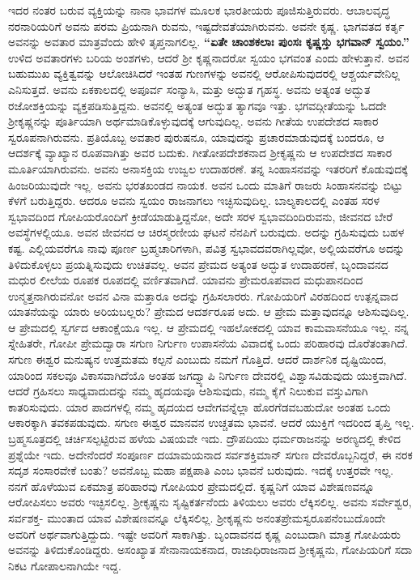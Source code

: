 ಇದರ ನಂತರ ಬರುವ ವ್ಯಕ್ತಿಯನ್ನು ನಾನಾ ಭಾವಗಳ ಮೂಲಕ ಭಾರತೀಯರು ಪೂಜಿಸುತ್ತಿರುವರು. ಆಬಾಲವೃದ್ಧ ನರನಾರಿಯರಿಗೆ ಅವನು ಪರಮ ಪ್ರಿಯನಾಗಿ ರುವನು, ಇಷ್ಟದೇವತೆಯಾಗಿರುವನು. ಅವನೇ ಕೃಷ್ಣ. ಭಾಗವತದ ಕರ್ತೃ ಅವನನ್ನು ಅವತಾರ ಮಾತ್ರವೆಂದು ಹೇಳಿ ತೃಪ್ತನಾಗಲಿಲ್ಲ. \textbf{“ಏತೇ ಚಾಂಶಕಲಾಃ ಪುಂಸಃ ಕೃಷ್ಣಸ್ತು ಭಗವಾನ್​ ಸ್ವಯಂ.”} ಉಳಿದ ಅವತಾರಗಳು ಬರಿಯ ಅಂಶಗಳು, ಆದರೆ ಶ‍್ರೀ ಕೃಷ್ಣನಾದರೋ ಸ್ವಯಂ ಭಗವಂತ ಎಂದು ಹೇಳುತ್ತಾನೆ. ಅವನ ಬಹುಮುಖ ವ್ಯಕ್ತಿತ್ವವನ್ನು ಆಲೋಚಿಸಿದರೆ ಇಂತಹ ಗುಣಗಳನ್ನು ಅವನಲ್ಲಿ ಆರೋಪಿಸುವುದರಲ್ಲಿ ಆಶ್ಚರ್ಯವೇನಿಲ್ಲ ಎನಿಸುತ್ತದೆ. ಅವನು ಏಕಕಾಲದಲ್ಲಿ ಅಪೂರ್ವ ಸಂನ್ಯಾಸಿ, ಮತ್ತು ಅದ್ಭುತ ಗೃಹಸ್ಥ. ಅವನು ಅತ್ಯಂತ ಅದ್ಭುತ ರಜೋಶಕ್ತಿಯನ್ನು ವ್ಯಕ್ತಪಡಿಸುತ್ತಿದ್ದನು. ಅವನಲ್ಲಿ ಅತ್ಯಂತ ಅದ್ಭುತ ತ್ಯಾಗವೂ ಇತ್ತು. ಭಗವದ್ಗೀತೆಯನ್ನು ಓದದೇ ಶ‍್ರೀಕೃಷ್ಣನನ್ನು ಪೂರ್ತಿಯಾಗಿ ಅರ್ಥಮಾಡಿಕೊಳ್ಳುವುದಕ್ಕೆ ಆಗುವುದಿಲ್ಲ. ಅವನು ಗೀತೆಯ ಉಪದೇಶದ ಸಾಕಾರ ಸ್ವರೂಪನಾಗಿರುವನು. ಪ್ರತಿಯೊಬ್ಬ ಅವತಾರ ಪುರುಷನೂ, ಯಾವುದನ್ನು ಪ್ರಚಾರಮಾಡುವುದಕ್ಕೆ ಬಂದರೂ, ಆ ಆದರ್ಶಕ್ಕೆ ವ್ಯಾಖ್ಯಾನ ರೂಪವಾಗಿತ್ತು ಅವರ ಬದುಕು. ಗೀತೋಪದೇಶಕನಾದ ಶ‍್ರೀಕೃಷ್ಣನು ಆ ಉಪದೇಶದ ಸಾಕಾರ ಮೂರ್ತಿಯಾಗಿರುವನು. ಅವನು ಅನಾಸಕ್ತಿಯ ಉಜ್ವಲ ಉದಾಹರಣೆ. ತನ್ನ ಸಿಂಹಾಸನವನ್ನು ಇತರರಿಗೆ ಕೊಡುವುದಕ್ಕೆ ಹಿಂಜರಿಯುವುದೇ ಇಲ್ಲ. ಅವನು ಭರತಖಂಡದ ನಾಯಕ. ಅವನ ಒಂದು ಮಾತಿಗೆ ರಾಜರು ಸಿಂಹಾಸನವನ್ನು ಬಿಟ್ಟು ಕೆಳಗೆ ಬರುತ್ತಿದ್ದರು. ಆದರೂ ಅವನು ಸ್ವಯಂ ರಾಜನಾಗಲು ಇಚ್ಛಿಸುವುದಿಲ್ಲ. ಬಾಲ್ಯಕಾಲದಲ್ಲಿ ಎಂತಹ ಸರಳ ಸ್ವಭಾವದಿಂದ ಗೋಪಿಯರೊಂದಿಗೆ ಕ್ರೀಡೆಯಾಡುತ್ತಿದ್ದನೋ, ಅದೇ ಸರಳ ಸ್ವಭಾವದಿಂದಿರುವನು, ಜೀವನದ ಬೇರೆ ಅವಸ್ಥೆಗಳಲ್ಲಿಯೂ. ಅವನ ಜೀವನದ ಆ ಚಿರಸ್ಮರಣೀಯ ಘಟನೆ ನೆನಪಿಗೆ ಬರುವುದು. ಅದನ್ನು ಗ್ರಹಿಸುವುದು ಬಹಳ ಕಷ್ಟ. ಎಲ್ಲಿಯವರೆಗೂ ನಾವು ಪೂರ್ಣ ಬ್ರಹ್ಮಚಾರಿಗಳಾಗಿ, ಪವಿತ್ರ ಸ್ವಭಾವದವರಾಗಿಲ್ಲವೋ, ಅಲ್ಲಿಯವರೆಗೂ ಅದನ್ನು ತಿಳಿದುಕೊಳ್ಳಲು ಪ್ರಯತ್ನಿಸುವುದು ಉಚಿತವಲ್ಲ. ಅವನ ಪ್ರೇಮದ ಅತ್ಯಂತ ಅದ್ಭುತ ಉದಾಹರಣೆ, ಬೃಂದಾವನದ ಮಧುರ ಲೀಲೆಯ ರೂಪಕ ರೂಪದಲ್ಲಿ ವರ್ಣಿತವಾಗಿದೆ. ಯಾವನು ಪ್ರೇಮರೂಪವಾದ ಮಧುಪಾನದಿಂದ ಉನ್ಮತ್ತನಾಗಿರುವನೋ ಅವನ ವಿನಾ ಮತ್ತಾರೂ ಅದನ್ನು ಗ್ರಹಿಸಲಾರರು. ಗೋಪಿಯರಿಗೆ ವಿರಹದಿಂದ ಉತ್ಪನ್ನವಾದ ಯಾತನೆಯನ್ನು ಯಾರು ಅರಿಯಬಲ್ಲರು? ಪ್ರೇಮದ ಆದರ್ಶರೂಪ ಅದು. ಆ ಪ್ರೇಮ ಮತ್ತಾವುದನ್ನೂ ಆಶಿಸುವುದಿಲ್ಲ. ಆ ಪ್ರೇಮದಲ್ಲಿ ಸ್ವರ್ಗದ ಆಕಾಂಕ್ಷೆಯೂ ಇಲ್ಲ. ಆ ಪ್ರೇಮದಲ್ಲಿ ಇಹಲೋಕದಲ್ಲಿ ಯಾವ ಕಾಮವಾಸನೆಯೂ ಇಲ್ಲ. ನನ್ನ ಸ್ನೇಹಿತರೇ, ಗೋಪೀ ಪ್ರೇಮದ್ವಾರಾ ಸಗುಣ ನಿರ್ಗುಣ ಉಪಾಸನೆಯ ವಿವಾದಕ್ಕೆ ಒಂದು ಪರಿಹಾರವು ದೊರೆತಂತಾಗಿದೆ. ಸಗುಣ ಈಶ್ವರ ಮನುಷ್ಯನ ಉತ್ತಮತಮ ಕಲ್ಪನೆ ಎಂಬುದು ನಮಗೆ ಗೊತ್ತಿದೆ. ಆದರೆ ದಾರ್ಶನಿಕ ದೃಷ್ಟಿಯಿಂದ, ಯಾರಿಂದ ಸಕಲವೂ ವಿಕಾಸವಾಗಿದೆಯೊ ಅಂತಹ ಜಗದ್ವ್ಯಾಪಿ ನಿರ್ಗುಣ ದೇವರಲ್ಲಿ ವಿಶ್ವಾಸವಿಡುವುದು ಯುಕ್ತವಾಗಿದೆ. ಆದರೆ ಗ್ರಹಿಸಲು ಸಾಧ್ಯವಾದುದನ್ನು ನಮ್ಮ ಹೃದಯವೂ ಆಶಿಸುವುದು, ನಮ್ಮ ಕೈಗೆ ನಿಲುಕುವ ವಸ್ತುವಿಗಾಗಿ ಕಾತರಿಸುವುದು. ಯಾರ ಪಾದಗಳಲ್ಲಿ ನಮ್ಮ ಹೃದಯದ ಆವೇಗವನ್ನೆಲ್ಲಾ ಹೊರಗೆಡವಬಹುದೋ ಅಂತಹ ಒಂದು ಆಕಾರಕ್ಕಾಗಿ ತವಕಪಡುವುದು. ಸಗುಣ ಈಶ್ವರ ಮಾನವನ ಉಚ್ಚತಮ ಭಾವನೆ. ಆದರೆ ಯುಕ್ತಿಗೆ ಇದರಿಂದ ತೃಪ್ತಿ ಇಲ್ಲ. ಬ್ರಹ್ಮಸೂತ್ರದಲ್ಲಿ ಚರ್ಚಿಸಲ್ಪಟ್ಟಿರುವ ಹಳೆಯ ವಿಷಯವೇ ಇದು. ದ್ರೌಪದಿಯು ಧರ್ಮರಾಜನನ್ನು ಅರಣ್ಯದಲ್ಲಿ ಕೇಳಿದ ಪ್ರಶ್ನೆಯೇ ಇದು. ಅದೇನೆಂದರೆ ಸಂಪೂರ್ಣ ದಯಾಮಯನಾದ ಸರ್ವಶಕ್ತಿಮಾನ್​ ಸಗುಣ ದೇವರೊಬ್ಬನಿದ್ದರೆ, ಈ ನರಕ ಸದೃಶ ಸಂಸಾರವೇಕೆ ಬಂತು? ಅವನೊಬ್ಬ ಮಹಾ ಪಕ್ಷಪಾತಿ ಎಂಬ ಭಾವನೆ ಬರುವುದು. ಇದಕ್ಕೆ ಉತ್ತರವೇ ಇಲ್ಲ. ನನಗೆ ಹೊಳೆಯುವ ಏಕಮಾತ್ರ ಪರಿಹಾರವು ಗೋಪಿಯರ ಪ್ರೇಮದಲ್ಲಿದೆ. ಕೃಷ್ಣನಿಗೆ ಯಾವ ವಿಶೇಷಣವನ್ನೂ ಆರೋಪಿಸಲು ಅವರು ಇಚ್ಛಿಸಲಿಲ್ಲ. ಶ‍್ರೀಕೃಷ್ಣನು ಸೃಷ್ಟಿಕರ್ತನೆಂದು ತಿಳಿಯಲು ಅವರು ಲೆಕ್ಕಿಸಲಿಲ್ಲ. ಅವನು ಸರ್ವೇಶ್ವರ, ಸರ್ವಶಕ್ತ- ಮುಂತಾದ ಯಾವ ವಿಶೇಷಣವನ್ನೂ ಲೆಕ್ಕಿಸಲಿಲ್ಲ. ಶ‍್ರೀಕೃಷ್ಣನು ಅನಂತಪ್ರೇಮಸ್ವರೂಪನೆಂಬುದೊಂದೇ ಅವರಿಗೆ ಅರ್ಥವಾಗುತ್ತಿದ್ದುದು. ಇಷ್ಟೇ ಅವರಿಗೆ ಸಾಕಾಗಿತ್ತು. ಬೃಂದಾವನದ ಕೃಷ್ಣ ಎಂಬುದಾಗಿ ಮಾತ್ರ ಗೋಪಿಯರು ಅವನನ್ನು ತಿಳಿದುಕೊಂಡಿದ್ದರು. ಅಸಂಖ್ಯಾತ ಸೇನಾನಾಯಕನಾದ, ರಾಜಾಧಿರಾಜನಾದ ಶ‍್ರೀಕೃಷ್ಣನು, ಗೋಪಿಯರಿಗೆ ಸದಾ ನಿಕಟ ಗೋಪಾಲನಾಗಿಯೇ ಇದ್ದ.

